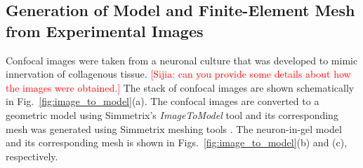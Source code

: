 \documentclass[10pt]{asme2ej}
\begin{document}
\subsection{Generation of Model and Finite-Element Mesh from Experimental Images}
Confocal images were taken from a neuronal culture that was developed to mimic innervation of collagenous tissue. \textcolor{red}{[Sijia: can you provide some details about how the images were obtained.]} The stack of confocal images are shown schematically in Fig.\ \ref{fig:image_to_model}(a). The confocal images are converted to a geometric model using Simmetrix's \textit{ImageToModel} tool \cite{simmetrix} and its corresponding mesh was generated using Simmetrix meshing tools \cite{simmetrix,Shephard:2000vc}. The neuron-in-gel model and its corresponding mesh is shown in Figs.\ \ref{fig:image_to_model}(b) and (c), respectively. 
%
\end{document}

